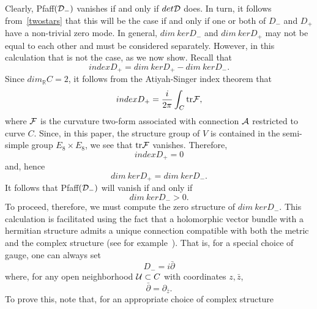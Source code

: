 \documentclass[a4paper,12pt]{article}
\numberwithin{equation}{section}
\theoremstyle{plain}
\begin{document}

Clearly, Pfaff$({\cal D}_{-})$ vanishes if and only if $det{\cal D}$
does. In turn, it follows from~\eqref{twostars} that this will be the case
if and only if one or both of $D_{-}$ and $D_{+}$ have a non-trivial zero
mode.
In general, $dim{\ }kerD_{-}$ and  $dim{\ }kerD_{+}$ may not be equal to
each
other and must be considered separately. However, in this calculation that
is
not the case, as we now show. Recall that
%
\begin{equation}
index D_{+} = dim {\ } ker D_{+} - dim {\ } ker D_{-}.
\label{15}
\end{equation}
%
Since $dim_{{\mathbb R}}C=2$, it follows from the Atiyah-Singer index
theorem that
%
\begin{equation}
index D_{+} = \frac{i}{2\pi} \int_{ C}{{\rm tr} {\cal{F}}},
\label{16}
\end{equation}
%
where ${\cal{F}}$ is the curvature two-form associated with connection
${\cal{A}}$
restricted to curve $C$. Since, in this paper, the structure group of $V$
is contained in the semi-simple group $E_{8} \times E_{8}$,
we see that ${\rm tr}{\cal{F}}$ vanishes.
Therefore,
%
\begin{equation}
index D_{+} =0
\label{17}
\end{equation}
%
and, hence
%
\begin{equation}
dim{\ } ker D_{+} = dim{\ } ker D_{-}.
\label{18}
\end{equation}
%
It follows that Pfaff$({\cal D}_{-})$ will vanish if and only if
%
\begin{equation}
dim{\ } ker D_{-} >0 .
\label{threelines}
\end{equation}
%
To proceed, therefore, we must compute the zero structure of $dim{\ } ker
D_{-}$.
This calculation is facilitated using the fact that a holomorphic vector
bundle with a hermitian structure admits a unique connection compatible
with
both the metric and the complex
structure (see for example~\cite{GH}). That is,
for a special choice
of gauge, one can always set
%
\begin{equation}
D_{-} = i\bar \partial
\label{doublecheck}
\end{equation}
%
where, for any open neighborhood ${\cal{U}} \subset C$ with coordinates
$z, \bar z$,
%
\begin{equation}
\bar \partial = \partial_{\bar z}.
\label{19}
\end{equation}
%
To prove this, note that, for an appropriate choice of complex structure
\end{document}
